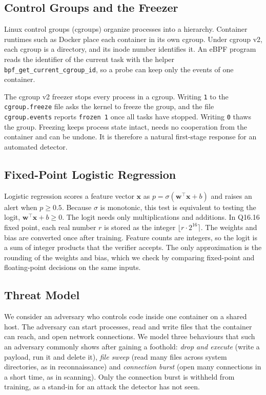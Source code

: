 \subsection{Control Groups and the Freezer}

Linux control groups (cgroups) organize processes into a hierarchy. Container runtimes such as Docker place each container in its own cgroup. Under cgroup v2, each cgroup is a directory, and its inode number identifies it. An eBPF program reads the identifier of the current task with the helper \texttt{bpf\_get\_current\_cgroup\_id}, so a probe can keep only the events of one container.

The cgroup v2 freezer stops every process in a cgroup. Writing \texttt{1} to the \texttt{cgroup.freeze} file asks the kernel to freeze the group, and the file \texttt{cgroup.events} reports \texttt{frozen 1} once all tasks have stopped. Writing \texttt{0} thaws the group. Freezing keeps process state intact, needs no cooperation from the container and can be undone. It is therefore a natural first-stage response for an automated detector.

\subsection{Fixed-Point Logistic Regression}

Logistic regression scores a feature vector $\mathbf{x}$ as $p = \sigma(\mathbf{w}^\top \mathbf{x} + b)$ and raises an alert when $p \ge 0.5$. Because $\sigma$ is monotonic, this test is equivalent to testing the logit, $\mathbf{w}^\top \mathbf{x} + b \ge 0$. The logit needs only multiplications and additions. In Q16.16 fixed point, each real number $r$ is stored as the integer $\lfloor r \cdot 2^{16} \rceil$. The weights and bias are converted once after training. Feature counts are integers, so the logit is a sum of integer products that the verifier accepts. The only approximation is the rounding of the weights and bias, which we check by comparing fixed-point and floating-point decisions on the same inputs.

\subsection{Threat Model}
\label{sec:threat}

We consider an adversary who controls code inside one container on a shared host. The adversary can start processes, read and write files that the container can reach, and open network connections. We model three behaviours that such an adversary commonly shows after gaining a foothold: \emph{drop and execute} (write a payload, run it and delete it), \emph{file sweep} (read many files across system directories, as in reconnaissance) and \emph{connection burst} (open many connections in a short time, as in scanning). Only the connection burst is withheld from training, as a stand-in for an attack the detector has not seen.


